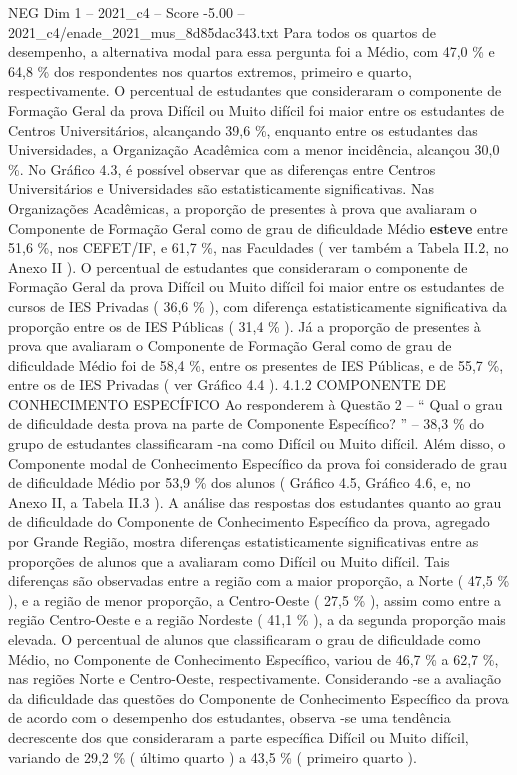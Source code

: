 \begin{textsample}{NEG Dim 1 – 2021\_c4 – Score -5.00 – 2021\_c4/enade\_2021\_mus\_8d85dac343.txt}
Para todos os quartos de desempenho, a alternativa modal para essa pergunta foi a Médio, com 47,0 \% e 64,8 \% dos respondentes nos quartos extremos, primeiro e quarto, respectivamente.
O percentual de estudantes que consideraram o componente de Formação Geral da prova Difícil ou Muito difícil foi maior entre os estudantes de Centros Universitários, alcançando 39,6 \%, enquanto entre os estudantes das Universidades, a Organização Acadêmica com a menor incidência, alcançou 30,0 \%.
No Gráfico 4.3, é possível observar que as diferenças entre Centros Universitários e Universidades são estatisticamente significativas.
Nas Organizações Acadêmicas, a proporção de presentes à prova que avaliaram o Componente de Formação Geral como de grau de dificuldade Médio \textbf{esteve} entre 51,6 \%, nos CEFET/IF, e 61,7 \%, nas Faculdades ( ver também a Tabela II.2, no Anexo II ).
O percentual de estudantes que consideraram o componente de Formação Geral da prova Difícil ou Muito difícil foi maior entre os estudantes de cursos de IES Privadas ( 36,6 \% ), com diferença estatisticamente significativa da proporção entre os de IES Públicas ( 31,4 \% ).
Já a proporção de presentes à prova que avaliaram o Componente de Formação Geral como de grau de dificuldade Médio foi de 58,4 \%, entre os presentes de IES Públicas, e de 55,7 \%, entre os de IES Privadas ( ver Gráfico 4.4 ). 4.1.2 COMPONENTE DE CONHECIMENTO ESPECÍFICO Ao responderem à Questão 2 – “ Qual o grau de dificuldade desta prova na parte de Componente Específico? ” – 38,3 \% do grupo de estudantes classificaram -na como Difícil ou Muito difícil.
Além disso, o Componente modal de Conhecimento Específico da prova foi considerado de grau de dificuldade Médio por 53,9 \% dos alunos ( Gráfico 4.5, Gráfico 4.6, e, no Anexo II, a Tabela II.3 ).
A análise das respostas dos estudantes quanto ao grau de dificuldade do Componente de Conhecimento Específico da prova, agregado por Grande Região, mostra diferenças estatisticamente significativas entre as proporções de alunos que a avaliaram como Difícil ou Muito difícil.
Tais diferenças são observadas entre a região com a maior proporção, a Norte ( 47,5 \% ), e a região de menor proporção, a Centro-Oeste ( 27,5 \% ), assim como entre a região Centro-Oeste e a região Nordeste ( 41,1 \% ), a da segunda proporção mais elevada.
O percentual de alunos que classificaram o grau de dificuldade como Médio, no Componente de Conhecimento Específico, variou de 46,7 \% a 62,7 \%, nas regiões Norte e Centro-Oeste, respectivamente.
Considerando -se a avaliação da dificuldade das questões do Componente de Conhecimento Específico da prova de acordo com o desempenho dos estudantes, observa -se uma tendência decrescente dos que consideraram a parte específica Difícil ou Muito difícil, variando de 29,2 \% ( último quarto ) a 43,5 \% ( primeiro quarto ).

\end{textsample}
